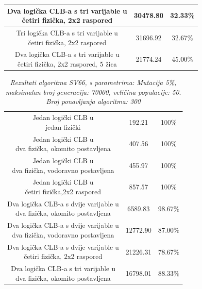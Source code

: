 \documentclass[times, utf8, zavrsni]{fer}
\begin{document}
\begin{table}[htb]
\begin{tabular}{|c | c | c|}
				\makecell{Dva logička CLB-a s tri varijable u \\ četiri fizička, 2x2 raspored} & 30478.80 & 32.33\% \\ \hline
				\makecell{Tri logička CLB-a s tri varijable u \\ četiri fizička, 2x2 raspored} & 31696.92 & 32.67\% \\ \hline
				\makecell{Dva logička CLB-a s tri varijable u \\ četiri fizička, 2x2 raspored, 5 žica} & 21774.24 & 45.00\% \\ \hline
			\end{tabular}
		\end{table}
		
		
		\begin{table}[htb]
			\caption{\emph{Rezultati algoritma SV66, s parametrima: Mutacija 5\%, maksimalan broj generacija: 70000, veličina populacije: 50. Broj ponavljanja algoritma: 300}}
			\label{gen-alg}
			\centering
			\begin{tabular}{|c | c| c|} \hline
				\thead{Opis} & \thead{Vrijeme u generacijama} & \thead{Uspješnost} \\ \hline
				\makecell{Jedan logički CLB u \\ jedan fizički }& 192.21 & 100\% \\ \hline
				\makecell{Jedan logički CLB u \\ dva fizička, okomito postavljena} & 407.56 & 100\% \\ \hline
				\makecell{Jedan logički CLB u \\ dva fizička, vodoravno postavljena} & 455.97 & 100\% \\ \hline
				\makecell{Jedan logički CLB u \\ četiri fizička,2x2 raspored} & 857.57 & 100\% \\ \hline
				\makecell{Dva logička CLB-a s dvije varijable u \\ dva fizička, okomito postavljena} & 6589.83 & 98.67\% \\ \hline
				\makecell{Dva logička CLB-a s dvije varijable u \\ dva fizička, vodoravno postavljena} & 12772.90 & 87.00\% \\ \hline
				\makecell{Dva logička CLB-a s dvije varijable u \\ četiri fizička, 2x2 raspored} & 21226.31 & 78.67\% \\ \hline
				\makecell{Dva logička CLB-a s tri varijable u \\ dva fizička, okomito postavljena} & 16798.01 & 88.33\% \\ \hline

\end{tabular}
\end{table}
\end{document}
